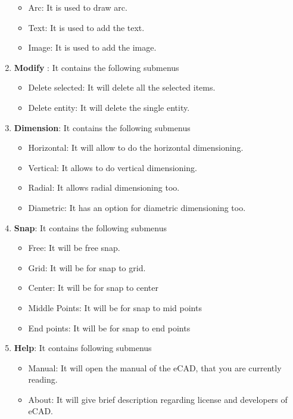 \begin{enumerate}
\begin{itemize}
\item Arc: It is used to draw arc.
\item Text: It is used to add the text.
\item Image: It is used to add the image.
\end{itemize}
\item \textbf{Modify} : It contains the following submenus
\begin{itemize}
\item Delete selected: It will delete all the selected items.
\item Delete entity: It will delete the single entity. 
\end{itemize}
\item \textbf{Dimension}: It contains the following submenus
\begin{itemize}
\item Horizontal: It will allow to do the horizontal dimensioning.
\item Vertical: It allows to do vertical dimensioning.
\item Radial: It allows radial dimensioning too.
\item Diametric: It has an option for diametric dimensioning too.
\end{itemize}
\item \textbf{Snap}: It contains the following submenus
\begin{itemize}
\item Free: It will be free snap.
\item Grid: It will be for snap to grid. 
\item Center: It will be for snap to center
\item Middle Points: It will be for snap to mid points
\item End points: It will be for snap to end points
\end{itemize}
\item \textbf{Help}: It contains following submenus
\begin{itemize}
\item Manual: It will open the manual of the eCAD, that you are currently reading.
\item About: It will give brief description regarding license and developers of eCAD.
\end{itemize}
\end{enumerate}
\newpage
